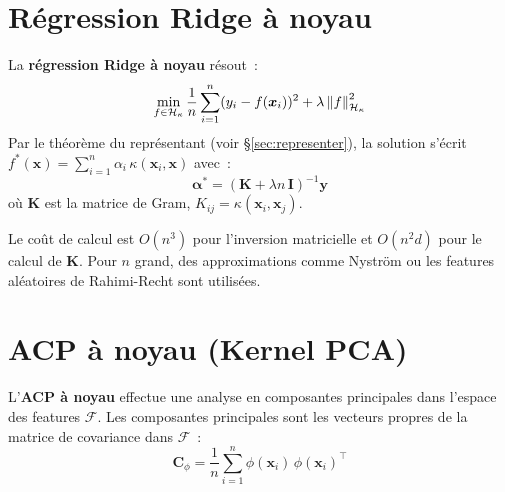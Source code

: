 \section{R\'egression Ridge \`a noyau}
\label{sec:kernel-ridge}

\begin{definition}
\label{def:krr}
La \textbf{r\'egression Ridge \`a noyau} r\'esout~:
\begin{equation}
  \min_{f \in \mathcal{H}_\kappa} \frac{1}{n}
  \sum_{i=1}^n (y_i - f(\bm{x}_i))^2 + \lambda \left\| f \right\|^2_{\mathcal{H}_\kappa}
  \label{eq:krr-functional}
\end{equation}
Par le th\'eor\`eme du repr\'esentant (voir \S\ref{sec:representer}),
la solution s'\'ecrit $f^*(\bm{x}) = \sum_{i=1}^n \alpha_i\,
\kappa(\bm{x}_i, \bm{x})$ avec~:
\begin{equation}
  \bm{\alpha}^* = (\bm{K} + \lambda n\, \bm{I})^{-1} \bm{y}
  \label{eq:krr-alpha}
\end{equation}
o\`u $\bm{K}$ est la matrice de Gram, $K_{ij} = \kappa(\bm{x}_i, \bm{x}_j)$.
\end{definition}

\begin{remarque}
Le co\^ut de calcul est $O(n^3)$ pour l'inversion matricielle et $O(n^2 d)$
pour le calcul de $\bm{K}$. Pour $n$ grand, des approximations comme
Nystr\"om ou les features al\'eatoires de Rahimi-Recht sont utilis\'ees.
\end{remarque}

\section{ACP \`a noyau (Kernel PCA)}
\label{sec:kernel-pca}

\begin{definition}
L'\textbf{ACP \`a noyau} effectue une analyse en composantes principales
dans l'espace des features $\mathcal{F}$. Les composantes principales
sont les vecteurs propres de la matrice de covariance dans $\mathcal{F}$~:
\begin{equation}
  \bm{C}_\phi = \frac{1}{n} \sum_{i=1}^n \phi(\bm{x}_i)\,
  \phi(\bm{x}_i)^\top
\end{equation}
\end{definition}

